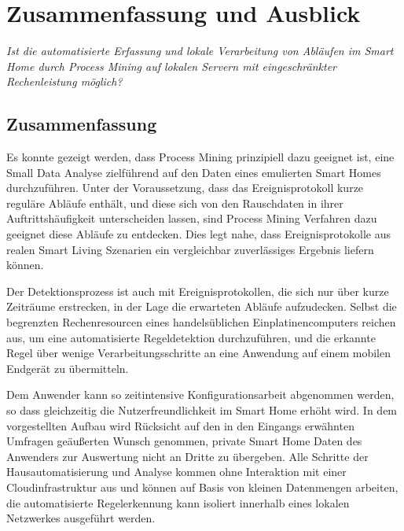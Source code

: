 \chapter{Zusammenfassung und Ausblick}
\textsl{Ist die automatisierte Erfassung und lokale Verarbeitung von Abläufen im Smart Home durch Process Mining auf lokalen Servern mit eingeschränkter Rechenleistung möglich?}
\vspace{2mm}
\section{Zusammenfassung}
Es konnte gezeigt werden, dass Process Mining prinzipiell dazu geeignet ist, eine Small Data Analyse zielführend auf den Daten eines emulierten Smart Homes durchzuführen. Unter der Voraussetzung, dass das Ereignisprotokoll kurze reguläre Abläufe enthält, und diese sich von den Rauschdaten in ihrer Auftrittshäufigkeit unterscheiden lassen, sind Process Mining Verfahren dazu geeignet diese Abläufe zu entdecken. Dies legt nahe, dass Ereignisprotokolle aus realen Smart Living Szenarien ein vergleichbar zuverlässiges Ergebnis liefern können. 

Der Detektionsprozess ist auch mit Ereignisprotokollen, die sich nur über kurze Zeiträume erstrecken, in der Lage die erwarteten Abläufe aufzudecken. Selbst die begrenzten Rechenresourcen eines handelsüblichen Einplatinencomputers reichen aus, um eine automatisierte Regeldetektion durchzuführen, und die erkannte Regel über wenige Verarbeitungsschritte an eine Anwendung auf einem mobilen Endgerät zu übermitteln.

Dem Anwender kann so zeitintensive Konfigurationsarbeit abgenommen werden, so dass gleichzeitig die Nutzerfreundlichkeit im Smart Home erhöht wird. In dem vorgestellten Aufbau wird Rücksicht auf den in den Eingangs erwähnten Umfragen geäußerten Wunsch genommen, private Smart Home Daten des Anwenders zur Auswertung nicht an Dritte zu übergeben. Alle Schritte der Hausautomatisierung und Analyse kommen ohne Interaktion mit einer Cloudinfrastruktur aus und können auf Basis von kleinen Datenmengen arbeiten, die automatisierte Regelerkennung kann isoliert innerhalb eines lokalen Netzwerkes ausgeführt werden.

